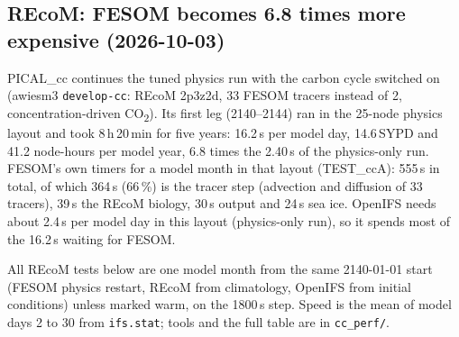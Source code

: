 \documentclass[11pt,a4paper]{article}
\begin{document}
\subsection{REcoM: FESOM becomes 6.8 times more expensive (2026-10-03)}
PICAL\_cc continues the tuned physics run with the carbon cycle switched on (awiesm3 \texttt{develop-cc}: REcoM 2p3z2d, 33 FESOM tracers instead of 2, concentration-driven CO\textsubscript{2}). Its first leg (2140--2144) ran in the 25-node physics layout and took 8\,h\,20\,min for five years: 16.2\,s per model day, 14.6\,SYPD and 41.2 node-hours per model year, 6.8 times the 2.40\,s of the physics-only run. FESOM's own timers for a model month in that layout (TEST\_ccA): 555\,s in total, of which 364\,s (66\,\%) is the tracer step (advection and diffusion of 33 tracers), 39\,s the REcoM biology, 30\,s output and 24\,s sea ice. OpenIFS needs about 2.4\,s per model day in this layout (physics-only run), so it spends most of the 16.2\,s waiting for FESOM.

All REcoM tests below are one model month from the same 2140-01-01 start (FESOM physics restart, REcoM from climatology, OpenIFS from initial conditions) unless marked warm, on the 1800\,s step. Speed is the mean of model days 2 to 30 from \texttt{ifs.stat}; tools and the full table are in \texttt{cc\_perf/}.
\end{document}
